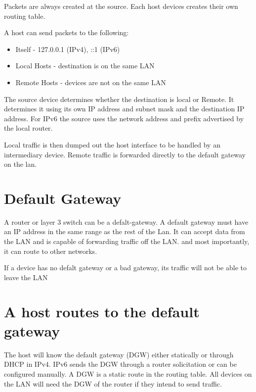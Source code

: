 \documentclass{article}
\begin{document}
\begin{flushleft}
    Packets are always created at the source. Each host devices creates their own routing table.

    A host can send packets to the following:
        \begin{itemize}
            \item Itself - 127.0.0.1 (IPv4), ::1 (IPv6)
            \item Local Hosts - destination is on the same LAN
            \item Remote Hosts - devices are not on the same LAN
        \end{itemize}

    The source device determines whether the destination is local or Remote. It determines it 
    using its own IP address and subnet mask and the destination IP address. For IPv6 the source
    uses the network address and prefix advertised by the local router.

    Local traffic is then dumped out the host interface to be handled by an intermediary device. Remote
    traffic is forwarded directly to the default gateway on the lan.
\end{flushleft}

\section{\textbf{Default Gateway}}

\begin{flushleft}
    A router or layer 3 switch can be a defalt-gateway. A default gateway must have an IP address in the same range
    as the rest of the Lan. It can accept data from the LAN and is capable of forwarding traffic off the LAN. and
    most importantly, it can route to other networks. 

    If a device has no defalt gateway or a bad gateway, its traffic will not be able to leave the LAN
\end{flushleft}

\section{\textbf{A host routes to the default gateway}}

\begin{flushleft}
    The host will know the default gateway (DGW) either statically or through DHCP in IPv4.
    IPv6 sends the DGW through a router solicitation or can be configured manually. A DGW is a static 
    route in the routing table. All devices on the LAN will need the DGW of the router if they intend to send traffic.
\end{flushleft}
\end{document}
